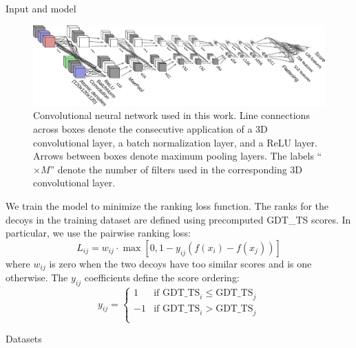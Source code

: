\documentclass[final, unknownkeysallowed]{beamer}
\begin{document}
\begin{frame}{}
\begin{textblock}{39.0}
\begin{block}{Input and model}
\begin{figure}[H]
    \centering
    \includegraphics[width=\linewidth]{../draft/Fig/ConvnetDiagramV1.png}
    \captionsetup{width=0.8\linewidth}
    \caption{Convolutional neural network used in this work. Line
      connections across boxes denote the consecutive application of a
      3D convolutional layer, a batch normalization layer, and a ReLU
      layer. Arrows between boxes denote maximum pooling layers. The
      labels ``$\times M$'' denote the number of filters used in the
      corresponding 3D convolutional layer.}
    \label{Fig:CNNModel}
\end{figure}

We train the model to minimize the ranking loss function.  The ranks
for the decoys in the training dataset are defined using precomputed
GDT\_TS scores.  In particular, we use the pairwise ranking loss:
$$
L_{ij} = w_{ij} \cdot \max \left[ 0, 1 - y_{ij} \left( f(x_i) - f(x_j) \right) \right]
$$
where $w_{ij}$ is zero when the two decoys have too similar scores and is one
otherwise.  The $y_{ij}$ coefficients define the score ordering:
$$
y_{ij} = \begin{cases}
                1& \text{if } \textrm{GDT\_TS}_i \leq \textrm{GDT\_TS}_j \\
               -1& \text{if } \textrm{GDT\_TS}_i > \textrm{GDT\_TS}_j \\
           \end{cases}
$$

\end{block}

\begin{block}{Datasets}


\end{block}
\end{textblock}
\end{frame}
\end{document}
